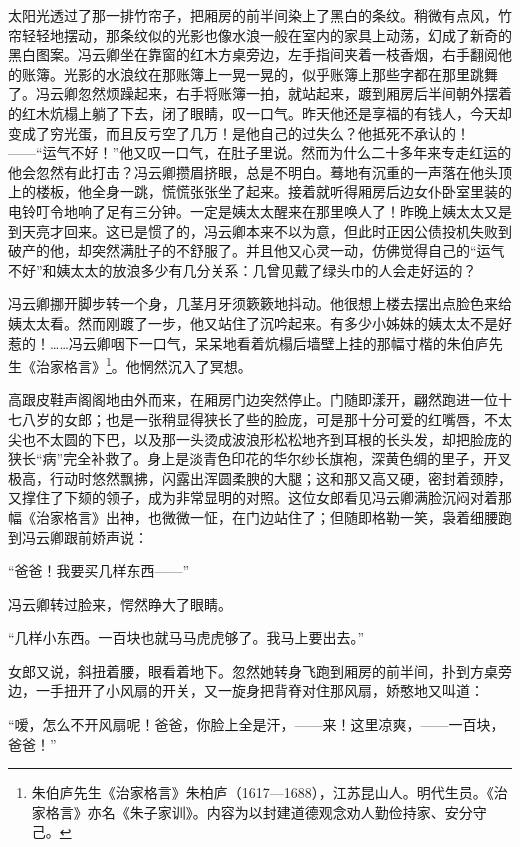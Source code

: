 \par 太阳光透过了那一排竹帘子，把厢房的前半间染上了黑白的条纹。稍微有点风，竹帘轻轻地摆动，那条纹似的光影也像水浪一般在室内的家具上动荡，幻成了新奇的黑白图案。冯云卿坐在靠窗的红木方桌旁边，左手指间夹着一枝香烟，右手翻阅他的账簿。光影的水浪纹在那账簿上一晃一晃的，似乎账簿上那些字都在那里跳舞了。冯云卿忽然烦躁起来，右手将账簿一拍，就站起来，踱到厢房后半间朝外摆着的红木炕榻上躺了下去，闭了眼睛，叹一口气。昨天他还是享福的有钱人，今天却变成了穷光蛋，而且反亏空了几万！是他自己的过失么？他抵死不承认的！——“运气不好！”他又叹一口气，在肚子里说。然而为什么二十多年来专走红运的他会忽然有此打击？冯云卿攒眉挤眼，总是不明白。蓦地有沉重的一声落在他头顶上的楼板，他全身一跳，慌慌张张坐了起来。接着就听得厢房后边女仆卧室里装的电铃叮令地响了足有三分钟。一定是姨太太醒来在那里唤人了！昨晚上姨太太又是到天亮才回来。这已是惯了的，冯云卿本来不以为意，但此时正因公债投机失败到破产的他，却突然满肚子的不舒服了。并且他又心灵一动，仿佛觉得自己的“运气不好”和姨太太的放浪多少有几分关系：几曾见戴了绿头巾的人会走好运的？
\par 冯云卿挪开脚步转一个身，几茎月牙须簌簌地抖动。他很想上楼去摆出点脸色来给姨太太看。然而刚踱了一步，他又站住了沉吟起来。有多少小姊妹的姨太太不是好惹的！……冯云卿咽下一口气，呆呆地看着炕榻后墙壁上挂的那幅寸楷的朱伯庐先生《治家格言》\footnote{朱伯庐先生《治家格言》朱柏庐（1617—1688），江苏昆山人。明代生员。《治家格言》亦名《朱子家训》。内容为以封建道德观念劝人勤俭持家、安分守己。}。他惘然沉入了冥想。
\par 高跟皮鞋声阁阁地由外而来，在厢房门边突然停止。门随即漾开，翩然跑进一位十七八岁的女郎；也是一张稍显得狭长了些的脸庞，可是那十分可爱的红嘴唇，不太尖也不太圆的下巴，以及那一头烫成波浪形松松地齐到耳根的长头发，却把脸庞的狭长“病”完全补救了。身上是淡青色印花的华尔纱长旗袍，深黄色绸的里子，开叉极高，行动时悠然飘拂，闪露出浑圆柔腴的大腿；这和那又高又硬，密封着颈脖，又撑住了下颏的领子，成为非常显明的对照。这位女郎看见冯云卿满脸沉闷对着那幅《治家格言》出神，也微微一怔，在门边站住了；但随即格勒一笑，袅着细腰跑到冯云卿跟前娇声说：
\par “爸爸！我要买几样东西——”
\par 冯云卿转过脸来，愕然睁大了眼睛。
\par “几样小东西。一百块也就马马虎虎够了。我马上要出去。”
\par 女郎又说，斜扭着腰，眼看着地下。忽然她转身飞跑到厢房的前半间，扑到方桌旁边，一手扭开了小风扇的开关，又一旋身把背脊对住那风扇，娇憨地又叫道：
\par “嗳，怎么不开风扇呢！爸爸，你脸上全是汗，——来！这里凉爽，——一百块，爸爸！”
